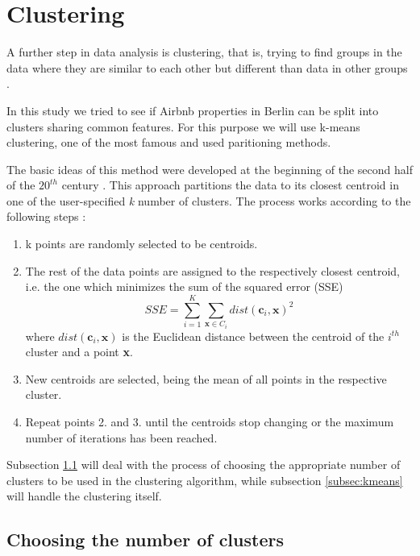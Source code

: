 \section{Clustering}\label{Sec:cluster}

A further step in data analysis is clustering, that is, trying to find groups in the data where they are similar to each other but different than data in other groups  \citep{kaufman2009finding}.

In this study we tried to see if Airbnb properties in Berlin can be split into clusters sharing common features. For this purpose we will use k-means clustering, one of the most famous and used paritioning methods.

The basic ideas of this method were developed at the beginning of the second half of the $20^{th}$ century \citep{bock2007clustering}. This approach partitions the data to its closest centroid in one of the user-specified \textit{k} number of clusters. The process works according to the following steps \citep{tan2018introduction}:
\begin{enumerate}
    \item k points are randomly selected to be centroids.
    \item The rest of the data points are assigned to the respectively closest centroid, i.e. the one which minimizes the sum of the squared error (SSE)
    \begin{equation}
SSE = \sum\limits_{i=1}^{K} \sum\limits_{\textbf{x}\in C_i} dist(\textbf{c}_i, \textbf{x})^2    
	\end{equation}
where $dist(\textbf{c}_i, \textbf{x})$ is the Euclidean distance between the centroid of the $i^{th}$ cluster and a point \textbf{x}.     
    \item New centroids are selected, being the mean of all points in the respective cluster.
    \item Repeat points 2. and 3. until the centroids stop changing or the maximum number of iterations has been reached.
\end{enumerate}

Subsection \ref{subsec:numclusters} will deal with the process of choosing the appropriate number of clusters to be used in the clustering algorithm, while subsection \ref{subsec:kmeans} will handle the clustering itself.

\subsection{Choosing the number of clusters}\label{subsec:numclusters}

